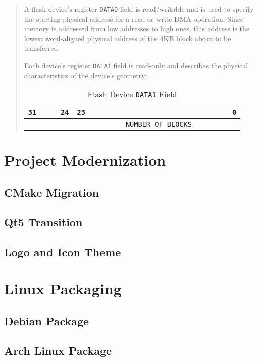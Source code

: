 \documentclass[12pt,a4paper,openright,twoside]{report}
\begin{document}
\begin{quote}
	A flash device’s register \texttt{DATA0} field is read/writable and is used to specify the starting physical address for a read or write DMA operation.
	Since memory is addressed from low addresses to high ones, this address is the lowest word-aligned physical address of the 4KB block about to be transferred.

	\newpage Each device's register \texttt{DATA1} field is read-only and describes the physical characteristics of the device's geometry:
	\begin{table}[h]
	\centering
	\begin{tabularx}{\textwidth}{XXXXXXXXXXXXXXXX}
	\texttt{31} & & & \multicolumn{1}{r}{\texttt{24}} & \texttt{23} & & & & & & & & & & & \multicolumn{1}{r}{\texttt{0}} \\ \hline
	\multicolumn{1}{|l}{\cellcolor{gray}} & \cellcolor{gray} & \cellcolor{gray} & \multicolumn{1}{l|}{\cellcolor{gray}} & & & & & & \multicolumn{2}{l}{\texttt{NUMBER OF BLOCKS}} & & & & & \multicolumn{1}{l|}{} \\ \hline
	\end{tabularx}
	\caption{Flash Device \texttt{DATA1} Field}
	\end{table}
	\end{quote}

\chapter{Project Modernization}
\lhead[\fancyplain{}{\bfseries\thepage}]{\fancyplain{}{\bfseries\rightmark}}
\section{CMake Migration}
\section{Qt5 Transition}
\section{Logo and Icon Theme}
\chapter{Linux Packaging}
\lhead[\fancyplain{}{\bfseries\thepage}]{\fancyplain{}{\bfseries\rightmark}}
\section{Debian Package}
\section{Arch Linux Package}
\end{document}
